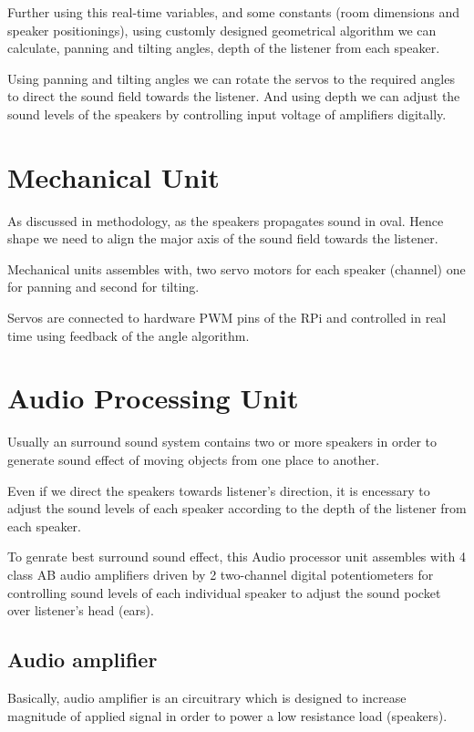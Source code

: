 \documentclass[../../../patent_v1.tex]{subfiles}
\begin{document}
Further using this real-time variables, and some constants (room dimensions and speaker positionings),
using customly designed geometrical algorithm we can calculate, panning and tilting angles, depth of 
the listener from each speaker.

Using panning and tilting angles we can rotate the servos to the required angles to direct the sound field
towards the listener. And using depth we can adjust the sound levels of the speakers by controlling
input voltage of amplifiers digitally.

\section{Mechanical Unit}

As discussed in methodology, as the speakers propagates sound in oval. Hence shape we need to align 
the major axis of the sound field towards the listener.

Mechanical units assembles with, two servo motors for each speaker (channel)
one for panning and second for tilting.

Servos are connected to hardware PWM pins of the RPi and controlled in real time using feedback 
of the angle algorithm.

\section{Audio Processing Unit}

Usually an surround sound system contains two or more speakers in order to generate sound effect
of moving objects from one place to another.

Even if we direct the speakers towards listener's direction, it is encessary to adjust the sound
levels of each speaker according to the depth of the listener from each speaker.

To genrate best surround sound effect, this Audio processor unit assembles with 4 class AB audio 
amplifiers driven by 2 two-channel digital potentiometers for controlling sound levels of each individual speaker to adjust the sound 
pocket over listener's head (ears).

\subsection{Audio amplifier}

Basically, audio amplifier is an circuitrary which is designed to increase magnitude of applied 
signal in order to power a low resistance load (speakers).
\end{document}
